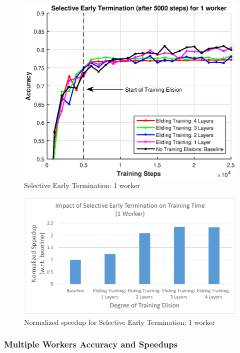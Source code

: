 \begin{figure}[t]
	\centering
	\includegraphics[width=0.8\columnwidth]{figures/fig6.eps}
	\caption{Selective Early Termination: 1 worker}
	\label{fig:fig6}
\end{figure}

\begin{figure}[t]
	\centering
	\includegraphics[width=0.8\columnwidth]{figures/fig7.PNG}
	\caption{Normalized speedup for Selective Early Termination: 1 worker}
	\label{fig:fig7}
\end{figure}
\subsubsection{Multiple Workers Accuracy and Speedups}

